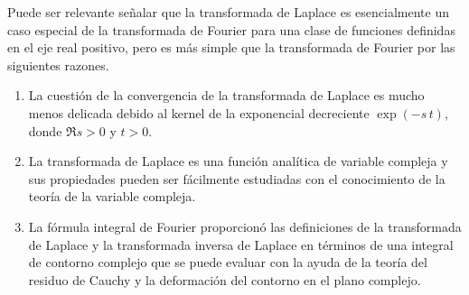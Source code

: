 \par
Puede ser relevante señalar que la transformada de Laplace es esencialmente un caso especial de la transformada de Fourier para una clase de funciones definidas en el eje real positivo, pero es más simple que la transformada de Fourier por las siguientes razones.
\begin{enumerate}
\item La cuestión de la convergencia de la transformada de Laplace es mucho menos delicada debido al kernel de la exponencial decreciente $\exp (-s \, t)$, donde $\Re{s} > 0$ y $t > 0$.
\item La transformada de Laplace es una función analítica de variable compleja y sus propiedades pueden ser fácilmente estudiadas con el conocimiento de la teoría de la variable compleja.
\item La fórmula integral de Fourier proporcionó las definiciones de la transformada de Laplace y la transformada inversa de Laplace en términos de una integral de contorno complejo que se puede evaluar con la ayuda de la teoría del residuo de Cauchy y la deformación del contorno en el plano complejo.
\end{enumerate}

